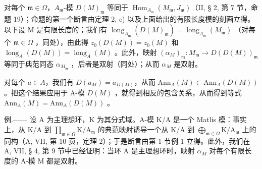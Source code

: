 对每个 \(\mathfrak{m} \in \Omega\)，\(A_{\mathfrak{m}}\)-模 \(D(M)_{\mathfrak{m}}\) 等同于 \(\operatorname{Hom}_{A_{\mathfrak{m}}} (M_{\mathfrak{m}}, J_{\mathfrak{m}})\)（II, § 2, 第 7 节，命题 19）；命题的第一个断言由定理 2, c) 以及上面给出的有限长度模的刻画立得。以下设 M 是有限长度的；我们有 \(\operatorname{long}_{A_{\mathfrak{m}}} (D(M)_{\mathfrak{m}}) = \operatorname{long}_{A_{\mathfrak{m}}} (M_{\mathfrak{m}})\) （对每个 \(\mathfrak{m} \in \Omega\) ，同处），由此得 \(z_0(D(M)) = z_0(M)\) 和 \(\operatorname{long}_A(D(M)) = \operatorname{long}_A(M)\) 。此外，映射 \((\alpha_{M})_{\mathfrak{m}}: M_{\mathfrak{m}} \to D(D(M))_{\mathfrak{m}}\) 等同于典范同态 \(\alpha_{M_{\mathfrak{m}}}\) ，后者是双射（同处）；从而 \(\alpha_{M}\) 是双射。

对每个 \(a \in A\)，我们有 \(D(a_{M}) = a_{D(M)}\)，从而 \(\text{Ann}_{A}(M) \subset \text{Ann}_{A}(D(M))\)。把这个结果应用于 A-模 \(D(M)\) ，就得到相反的包含关系，从而得到等式 \(\text{Ann}_{A}(M) = \text{Ann}_{A}(D(M))\) 。

例.—— 设 A 为主理想环，K 为其分式域。A-模 K/A 是一个 Matlis 模：事实上，从 K/A 到 \(\prod_{\mathfrak{m}\in\Omega}\mathrm{K}/\mathrm{A}_{\mathfrak{m}}\) 的典范映射诱导一个从 K/A 到 \(\bigoplus_{\mathfrak{m}\in\Omega}\mathrm{K}/\mathrm{A}_{\mathfrak{m}}\) 上的同构（A, VII, 第 10 页，定理 2）；于是断言由第 1 节例 1 立得。此外，我们在 A, VII, § 4, 第 9 节中已经证明：当环 A 是主理想环时，映射 \(\alpha_{M}\) 对每个有限长度的 A-模 M 都是双射。

